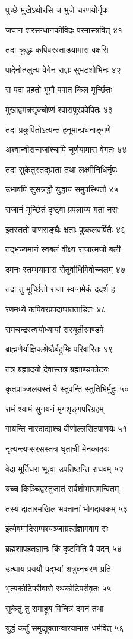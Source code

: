 पुच्छे मुखेऽथोरसि च भुजे चरणयोर्नृपः

जघान शरसन्धानकोविदः परमास्त्रवित् ४१

तदा क्रुद्धः कपिवरस्ताडयामास वक्षसि

पादेनोत्प्लुत्य वेगेन राज्ञः सुभटशोभिनः ४२

स पदा प्रहतो भूमौ पपात किल मूर्च्छितः

मुखाद्वमन्नसृक्चोष्णं श्वासपूरप्रवेपितः ४३

तदा प्रकुपितोऽत्यन्तं हनूमान्प्रधनाङ्गणे

अश्वान्वीरान्गजांश्चापि चूर्णयामास वेगतः ४४

तदा सुकेतुस्तद्भ्राता तथा लक्ष्मीनिधिर्नृपः

उभावपि सुसन्नद्धौ युद्धाय समुपस्थितौ ४५

राजानं मूर्च्छितं दृष्ट्वा प्रपलाय्य गता नराः

इतस्ततो बाणसङ्घैः क्षताः पुष्कलवर्षितैः ४६

तद्भज्यमानं स्वबलं वीक्ष्य राजात्मजो बली

दमनः स्तम्भयामास सेतुर्वार्धिमिवोच्चलम् ४७

तदा तु मूर्च्छितो राजा स्वप्नमेकं ददर्श ह

रणमध्ये कपिवरप्रपदाघातताडितः ४८

रामचन्द्रस्त्वयोध्यायां सरयूतीरमण्डपे

ब्राह्मणैर्याज्ञिकश्रेष्ठैर्बहुभिः परिवारितः ४९

तत्र ब्रह्मादयो देवास्तत्र ब्रह्माण्डकोटयः

कृतप्राञ्जलयस्तं वै स्तुवन्ति स्तुतिभिर्मुहुः ५०

रामं श्यामं सुनयनं मृगशृङ्गपरिग्रहम्

गायन्ति नारदाद्याश्च वीणोल्लसितपाणयः ५१

नृत्यन्त्यप्सरसस्तत्र घृताची मेनकादयः

वेदा मूर्तिधरा भूत्वा उपतिष्ठन्ति राघवम् ५२

यच्च किञ्चिद्वस्तुजातं सर्वशोभासमन्वितम्

तस्य दातारमखिलं भक्तानां भोगदायकम् ५३

इत्येवमादिसम्पश्यञ्जाग्रत्संज्ञामवाप सः

ब्रह्मशापहतज्ञानः किं दृष्टमिति वै वदन् ५४

उत्थाय प्रययौ पद्भ्यां शत्रुघ्नचरणं प्रति

भृत्यकोटिपरीवारो रथकोटिपरीवृतः ५५

सुकेतुं तु समाहूय विचित्रं दमनं तथा

युद्धं कर्तुं समुद्युक्तान्वारयामास धर्मवित् ५६

